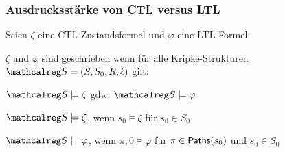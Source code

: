 \begin{frame}
  \frametitle{Ausdrucksstärke von CTL versus LTL}
  
  \begin{definition}
    Seien $\zeta$ eine CTL-Zustandsformel und $\varphi$ eine LTL-Formel.
    
    \par\smallskip
    $\zeta$ und $\varphi$ sind  geschrieben \Bmph{$\zeta \equiv \varphi$,}
    wenn für alle Kripke-Strukturen $\Smc = (S,S_0,R,\ell)$ gilt:
    \begin{center}
      $\Smc \models \zeta$
      \quad gdw.\quad
      $\Smc \models \varphi$
    \end{center}
  \end{definition}

  \par\medskip
  \begin{Itemize}
    \item
      $\Smc \models \zeta$, wenn $s_0 \models \zeta$ für  $s_0 \in S_0$
    \item
      $\Smc \models \varphi$, wenn $\pi,0 \models \varphi$ für  $\pi \in \textsf{Paths}(s_0)$ und  $s_0 \in S_0$
  \end{Itemize}
  
\end{frame}

